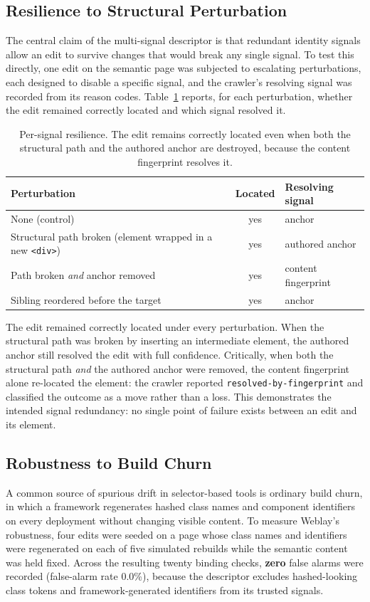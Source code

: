 \documentclass[conference]{IEEEtran}
\begin{document}
\subsection{Resilience to Structural Perturbation}
The central claim of the multi-signal descriptor is that redundant identity signals allow an edit to survive changes that would break any single signal. To test this directly, one edit on the semantic page was subjected to escalating perturbations, each designed to disable a specific signal, and the crawler's resolving signal was recorded from its reason codes. Table~\ref{tab:resilience} reports, for each perturbation, whether the edit remained correctly located and which signal resolved it.

\begin{table}[t]
\caption{Per-signal resilience. The edit remains correctly located even when both the structural path and the authored anchor are destroyed, because the content fingerprint resolves it.}
\label{tab:resilience}
\centering
\footnotesize
\begin{tabular}{@{}p{4.3cm}cp{2.1cm}@{}}
\toprule
\textbf{Perturbation} & \textbf{Located} & \textbf{Resolving signal} \\
\midrule
None (control)                         & yes & anchor \\
Structural path broken (element wrapped in a new \texttt{<div>}) & yes & authored anchor \\
Path broken \emph{and} anchor removed  & yes & content fingerprint \\
Sibling reordered before the target    & yes & anchor \\
\bottomrule
\end{tabular}
\end{table}

The edit remained correctly located under every perturbation. When the structural path was broken by inserting an intermediate element, the authored anchor still resolved the edit with full confidence. Critically, when both the structural path \emph{and} the authored anchor were removed, the content fingerprint alone re-located the element: the crawler reported \texttt{resolved-by-fingerprint} and classified the outcome as a move rather than a loss. This demonstrates the intended signal redundancy: no single point of failure exists between an edit and its element.

\subsection{Robustness to Build Churn}
A common source of spurious drift in selector-based tools is ordinary build churn, in which a framework regenerates hashed class names and component identifiers on every deployment without changing visible content. To measure Weblay's robustness, four edits were seeded on a page whose class names and identifiers were regenerated on each of five simulated rebuilds while the semantic content was held fixed. Across the resulting twenty binding checks, \textbf{zero} false alarms were recorded (false-alarm rate 0.0\%), because the descriptor excludes hashed-looking class tokens and framework-generated identifiers from its trusted signals.
\end{document}
